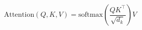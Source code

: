 \documentclass[preview]{standalone}
\begin{document}
\[
\text{Attention}(Q, K, V) = \text{softmax}\left(\frac{QK^\top}{\sqrt{d_k}}\right)V
\]
\end{document}
